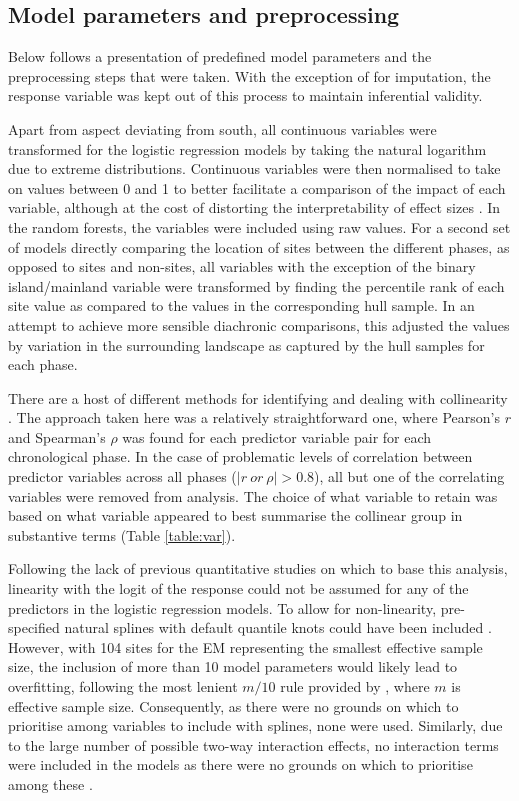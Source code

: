 \documentclass[12pt, a4paper]{article}
\begin{document}
\subsection{Model parameters and preprocessing}
Below follows a presentation of predefined model parameters and the preprocessing steps that were taken. With the exception of for imputation, the response variable was kept out of this process to maintain inferential validity.\par
Apart from aspect deviating from south, all continuous variables were transformed for the logistic regression models by taking the natural logarithm due to extreme distributions. Continuous variables were then normalised to take on values between 0 and 1 to better facilitate a comparison of the impact of each variable, although at the cost of distorting the interpretability of effect sizes \citep[cf.][]{spencer2018}. In the random forests, the variables were included using raw values. For a second set of models directly comparing the location of sites between the different phases, as opposed to sites and non-sites, all variables with the exception of the binary island/mainland variable were transformed by finding the percentile rank of each site value as compared to the values in the corresponding hull sample. In an attempt to achieve more sensible diachronic comparisons, this adjusted the values by variation in the surrounding landscape as captured by the hull samples for each phase.\par
There are a host of different methods for identifying and dealing with collinearity \citep[e.g.][]{dormann2012, tomaschek2018}. The approach taken here was a relatively straightforward one, where Pearson's $r$ and Spearman's $\rho$ was found for each predictor variable pair for each chronological phase. In the case of problematic levels of correlation between predictor variables across all phases ($|r\ or\ \rho| > 0.8$), all but one of the correlating variables were removed from analysis. The choice of what variable to retain was based on what variable appeared to best summarise the collinear group in substantive terms (Table \ref{table:var}).\par
Following the lack of previous quantitative studies on which to base this analysis, linearity with the logit of the response could not be assumed for any of the predictors in the logistic regression models. To allow for non-linearity, pre-specified natural splines with default quantile knots could have been included \cite[][26--28]{harrell2015}. However, with 104 sites for the EM representing the smallest effective sample size, the inclusion of more than 10 model parameters would likely lead to overfitting, following the most lenient $m/10$ rule provided by \citet[][72--73]{harrell2015}, where $m$ is effective sample size. Consequently, as there were no grounds on which to prioritise among variables to include with splines, none were used. Similarly, due to the large number of possible two-way interaction effects, no interaction terms were included in the models as there were no grounds on which to prioritise among these \citep[cf.][36--38]{harrell2015}.\par 
\end{document}
